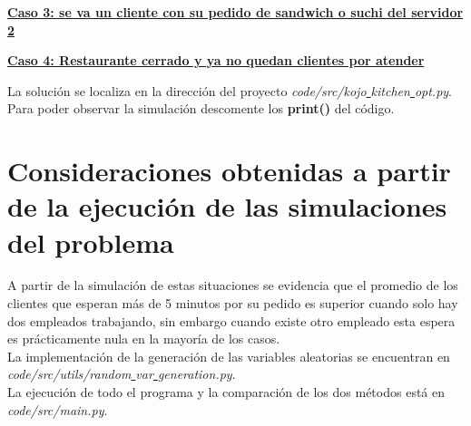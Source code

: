 \documentclass{book}
\begin{document}
			\underline{ \textbf{Caso 3: se va un cliente con su pedido de sandwich o suchi del servidor 2}}\\
			\begin{algorithmic}
					\EndIf
					\Else
					\EndIf
				\EndIf
			\end{algorithmic}
			\underline{ \textbf{Caso 4: Restaurante cerrado y ya no quedan clientes por atender}}
			\begin{algorithmic}
				\If{ min(ta, t1, t2, t3) $\geq$ T y SS = [0]}
					\State{BREAK}
				\EndIf
			\end{algorithmic}

			
			La soluci\'on se localiza en la direcci\'on del proyecto \textit{ code/src/kojo\underline{ }kitchen\underline{ }opt.py}. Para poder observar la simulaci\'on descomente los \textbf{print()} del c\'odigo.

	\section{Consideraciones obtenidas a partir de la ejecuci\'on de las simulaciones del problema}
	
		A partir de la simulaci\'on de estas situaciones se evidencia que el promedio de los clientes que esperan m\'as de 5 minutos por su pedido es superior cuando solo hay dos empleados trabajando, sin embargo cuando existe otro empleado esta espera es pr\'acticamente nula en la mayor\'ia de los casos. \\
		La implementaci\'on de la generaci\'on de las variables aleatorias se encuentran en \textit{code/src/utils/random\underline{ }var\underline{ }generation.py}. \\
		La ejecuci\'on de todo el programa y la comparaci\'on de los dos m\'etodos est\'a en \textit{code/src/main.py}.	
		
		
\end{document}
